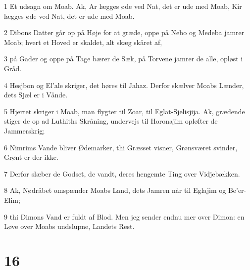 \par 1 Et udsagn om Moab. Ak, Ar lægges øde ved Nat, det er ude med Moab, Kir lægges øde ved Nat, det er ude med Moab.
\par 2 Dibons Datter går op på Høje for at græde, oppe på Nebo og Medeba jamrer Moab; hvert et Hoved er skaldet, alt skæg skåret af,
\par 3 på Gader og oppe på Tage bærer de Sæk, på Torvene jamrer de alle, opløst i Gråd.
\par 4 Hesjbon og El'ale skriger, det høres til Jahaz. Derfor skælver Moabs Lænder, dets Sjæl er i Vånde.
\par 5 Hjertet skriger i Moab, man flygter til Zoar, til Eglat-Sjelisjija. Ak, grædende stiger de op ad Luthiths Skråning, undervejs til Horonajim opløfter de Jammerskrig;
\par 6 Nimrims Vande bliver Ødemarker, thi Græsset visner, Grønsværet svinder, Grønt er der ikke.
\par 7 Derfor slæber de Godset, de vandt, deres hengemte Ting over Vidjebækken.
\par 8 Ak, Nødråbet omspænder Moabs Land, dets Jamren når til Eglajim og Be'er-Elim;
\par 9 thi Dimons Vand er fuldt af Blod. Men jeg sender endnu mer over Dimon: en Løve over Moabs undslupne, Landets Rest.

\chapter{16}

